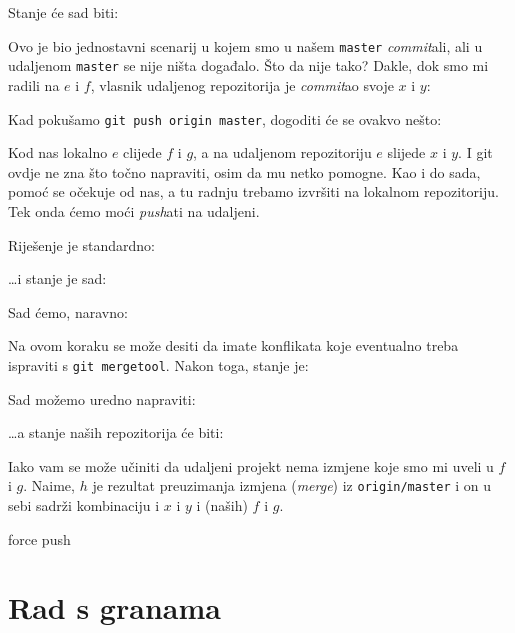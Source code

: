 

Stanje će sad biti:



Ovo je bio jednostavni scenarij u kojem smo u našem \verb+master+ \emph{commit}ali, ali u udaljenom \verb+master+ se nije ništa događalo.
Što da nije tako?
Dakle, dok smo mi radili na $e$ i $f$, vlasnik udaljenog repozitorija je \emph{commit}ao svoje $x$ i $y$:



Kad pokušamo \verb+git push origin master+, dogoditi će se ovakvo nešto:



Kod nas lokalno $e$ clijede $f$ i $g$, a na udaljenom repozitoriju $e$ slijede $x$ i $y$. 
I git ovdje ne zna što točno napraviti, osim da mu netko pomogne.
Kao i do sada, pomoć se očekuje od nas, a tu radnju trebamo izvršiti na lokalnom repozitoriju.
Tek onda ćemo moći \emph{push}ati na udaljeni.

Riješenje je standardno:


\dots{}i stanje je sad:



Sad ćemo, naravno:


Na ovom koraku se može desiti da imate konflikata koje eventualno treba ispraviti s \verb+git mergetool+.
Nakon toga, stanje je:



Sad možemo uredno napraviti:


\dots{}a stanje naših repozitorija će biti:



Iako vam se može učiniti da udaljeni projekt nema izmjene koje smo mi uveli u $f$ i $g$.
Naime, $h$ je rezultat preuzimanja izmjena (\emph{merge}) iz \verb+origin/master+ i on u sebi sadrži kombinaciju i $x$ i $y$ i (naših) $f$ i $g$.

\TODO force push

\section*{Rad s granama}

